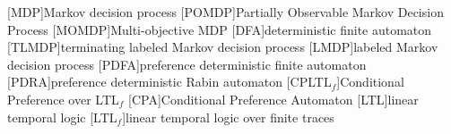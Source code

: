 [MDP]{Markov decision process}
[POMDP]{Partially Observable Markov Decision Process}
[MOMDP]{Multi-objective MDP}
[DFA]{deterministic finite automaton}
[TLMDP]{terminating labeled Markov decision process}
[LMDP]{labeled Markov decision process}
[PDFA]{preference deterministic finite automaton}
[PDRA]{preference deterministic Rabin automaton}
[CPLTL$_f$]{Conditional Preference over LTL$_f$}
[CPA]{Conditional Preference Automaton}
[LTL]{linear temporal logic}
[LTL$_f$]{linear temporal logic over finite traces}